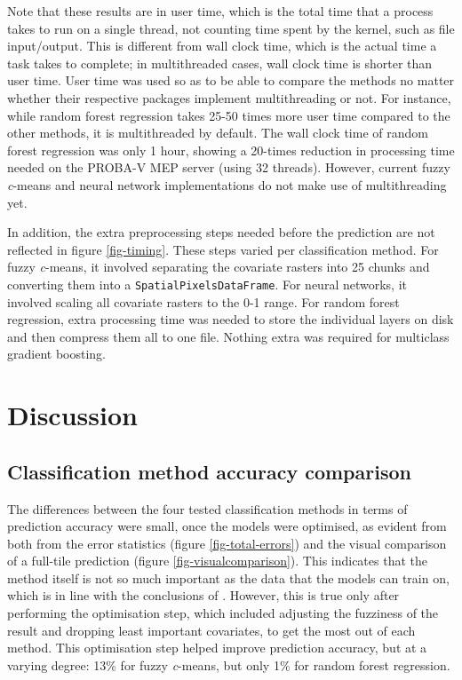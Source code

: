 \documentclass[a4paper,12pt]{scrbook}
\begin{document}
Note that these results are in user time, which is the total time that a process takes to run on a single thread, not counting time spent by the kernel, such as file input/output. This is different from wall clock time, which is the actual time a task takes to complete; in multithreaded cases, wall clock time is shorter than user time. User time was used so as to be able to compare the methods no matter whether their respective packages implement multithreading or not. For instance, while random forest regression takes 25-50 times more user time compared to the other methods, it is multithreaded by default. The wall clock time of random forest regression was only 1 hour, showing a 20-times reduction in processing time needed on the PROBA-V MEP server (using 32 threads). However, current fuzzy \textit{c}-means and neural network implementations do not make use of multithreading yet.

In addition, the extra preprocessing steps needed before the prediction are not reflected in figure \ref{fig-timing}. These steps varied per classification method. For fuzzy \textit{c}-means, it involved separating the covariate rasters into 25 chunks and converting them into a \texttt{SpatialPixelsDataFrame}. For neural networks, it involved scaling all covariate rasters to the 0-1 range. For random forest regression, extra processing time was needed to store the individual layers on disk and then compress them all to one file. Nothing extra was required for multiclass gradient boosting.

\chapter{Discussion}

\section{Classification method accuracy comparison}

The differences between the four tested classification methods in terms of prediction accuracy were small, once the models were optimised, as evident from both from the error statistics (figure \ref{fig-total-errors}) and the visual comparison of a full-tile prediction (figure \ref{fig-visualcomparison}). This indicates that the method itself is not so much important as the data that the models can train on, which is in line with the conclusions of \citet{yu2014metadiscoveries}. However, this is true only after performing the optimisation step, which included adjusting the fuzziness of the result and dropping least important covariates, to get the most out of each method. This optimisation step helped improve prediction accuracy, but at a varying degree: 13\% for fuzzy \textit{c}-means, but only 1\% for random forest regression.
\end{document}
